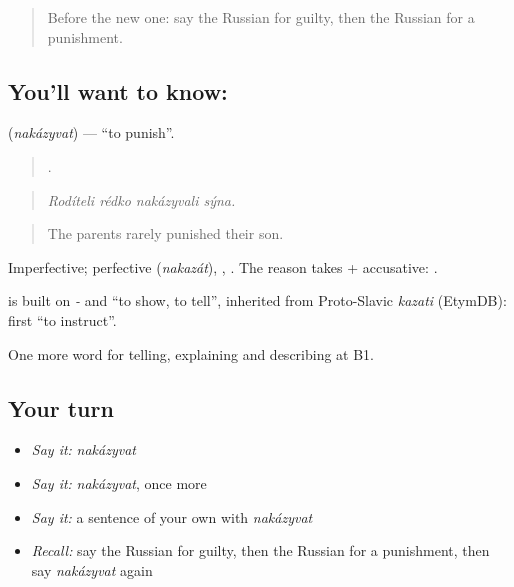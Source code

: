 \label{lesson:RU-C294-nakazyvat}



\begin{quote}
Before the new one: say the Russian for guilty, then the Russian for a punishment.
\end{quote}

\subsection*{You'll want to know: }
\textbf{} (\emph{nakázyvat}) — \textquotedblleft{}to punish\textquotedblright{}.

\begin{quote}
   .
\end{quote}

\begin{quote}
\emph{Rodíteli rédko nakázyvali sýna.}
\end{quote}

\begin{quote}
The parents rarely punished their son.
\end{quote}

Imperfective; perfective \emph{} (\emph{nakazát}), \emph{}, \emph{}. The reason takes \emph{} + accusative: \emph{  }.

\begin{cousinweb}
\emph{} is built on \emph{-} and \emph{} \textquotedblleft{}to show, to tell\textquotedblright{}, inherited from Proto-Slavic \emph{kazati} (EtymDB): first \textquotedblleft{}to instruct\textquotedblright{}.
\end{cousinweb}

\begin{grammarlens}[title={What you've built}]
One more word for telling, explaining and describing at B1.
\end{grammarlens}

\subsection*{Your turn}
\begin{itemize}
\raggedright
  \item \emph{Say it:} \emph{nakázyvat}
  \item \emph{Say it:} \emph{nakázyvat}, once more
  \item \emph{Say it:} a sentence of your own with \emph{nakázyvat}
  \item \emph{Recall:} say the Russian for guilty, then the Russian for a punishment, then say \emph{nakázyvat} again
\end{itemize}

